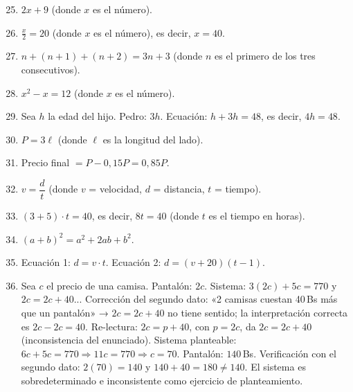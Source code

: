 \documentclass[12pt, letterpaper]{article}
\begin{document}
  \begin{enumerate}[leftmargin=*, label=\textbf{\arabic*.}]
    \setcounter{enumi}{24}
    \item $2x + 9$ (donde $x$ es el número).

    \item $\frac{x}{2} = 20$ (donde $x$ es el número), es decir, $x = 40$.

    \item $n + (n + 1) + (n + 2) = 3n + 3$ (donde $n$ es el primero de los tres consecutivos).

    \item $x^2 - x = 12$ (donde $x$ es el número).

    \item Sea $h$ la edad del hijo. Pedro: $3h$. Ecuación: $h + 3h = 48$, es decir, $4h = 48$.

    \item $P = 3\ell$ (donde $\ell$ es la longitud del lado).

    \item Precio final $= P - 0{,}15P = 0{,}85P$.

    \item $v = \dfrac{d}{t}$ (donde $v$ = velocidad, $d$ = distancia, $t$ = tiempo).

    \item $(3 + 5) \cdot t = 40$, es decir, $8t = 40$ (donde $t$ es el tiempo en horas).

    \item $(a + b)^2 = a^2 + 2ab + b^2$.

    \item Ecuación 1: $d = v \cdot t$. Ecuación 2: $d = (v + 20)(t - 1)$.

    \item Sea $c$ el precio de una camisa. Pantalón: $2c$. Sistema: $3(2c) + 5c = 770$ y $2c = 2c + 40$... Corrección del segundo dato: «2 camisas cuestan 40\,Bs más que un pantalón» → $2c = 2c + 40$ no tiene sentido; la interpretación correcta es $2c - 2c = 40$. Re-lectura: $2c = p + 40$, con $p = 2c$, da $2c = 2c + 40$ (inconsistencia del enunciado). Sistema planteable: $6c + 5c = 770 \Rightarrow 11c = 770 \Rightarrow c = 70$. Pantalón: $140$\,Bs. Verificación con el segundo dato: $2(70) = 140$ y $140 + 40 = 180 \neq 140$. El sistema es sobredeterminado e inconsistente como ejercicio de planteamiento.
  \end{enumerate}

\fi
\end{document}
